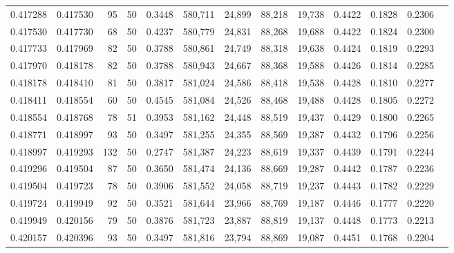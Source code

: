 \begin{tabular}{rrrrrrrrrrrrr}
0.417288 & 0.417530 &    95 &  50 &                                     0.3448 & 580,711 &  24,899 &  88,218 &  19,738 & 0.4422 & 0.1828 & 0.2306 \\
0.417530 & 0.417730 &    68 &  50 &                                     0.4237 & 580,779 &  24,831 &  88,268 &  19,688 & 0.4422 & 0.1824 & 0.2300 \\
0.417733 & 0.417969 &    82 &  50 &                                     0.3788 & 580,861 &  24,749 &  88,318 &  19,638 & 0.4424 & 0.1819 & 0.2293 \\
0.417970 & 0.418178 &    82 &  50 &                                     0.3788 & 580,943 &  24,667 &  88,368 &  19,588 & 0.4426 & 0.1814 & 0.2285 \\
0.418178 & 0.418410 &    81 &  50 &                                     0.3817 & 581,024 &  24,586 &  88,418 &  19,538 & 0.4428 & 0.1810 & 0.2277 \\
0.418411 & 0.418554 &    60 &  50 &                                     0.4545 & 581,084 &  24,526 &  88,468 &  19,488 & 0.4428 & 0.1805 & 0.2272 \\
0.418554 & 0.418768 &    78 &  51 &                                     0.3953 & 581,162 &  24,448 &  88,519 &  19,437 & 0.4429 & 0.1800 & 0.2265 \\
0.418771 & 0.418997 &    93 &  50 &                                     0.3497 & 581,255 &  24,355 &  88,569 &  19,387 & 0.4432 & 0.1796 & 0.2256 \\
0.418997 & 0.419293 &   132 &  50 &                                     0.2747 & 581,387 &  24,223 &  88,619 &  19,337 & 0.4439 & 0.1791 & 0.2244 \\
0.419296 & 0.419504 &    87 &  50 &                                     0.3650 & 581,474 &  24,136 &  88,669 &  19,287 & 0.4442 & 0.1787 & 0.2236 \\
0.419504 & 0.419723 &    78 &  50 &                                     0.3906 & 581,552 &  24,058 &  88,719 &  19,237 & 0.4443 & 0.1782 & 0.2229 \\
0.419724 & 0.419949 &    92 &  50 &                                     0.3521 & 581,644 &  23,966 &  88,769 &  19,187 & 0.4446 & 0.1777 & 0.2220 \\
0.419949 & 0.420156 &    79 &  50 &                                     0.3876 & 581,723 &  23,887 &  88,819 &  19,137 & 0.4448 & 0.1773 & 0.2213 \\
0.420157 & 0.420396 &    93 &  50 &                                     0.3497 & 581,816 &  23,794 &  88,869 &  19,087 & 0.4451 & 0.1768 & 0.2204 \\

\end{tabular}
